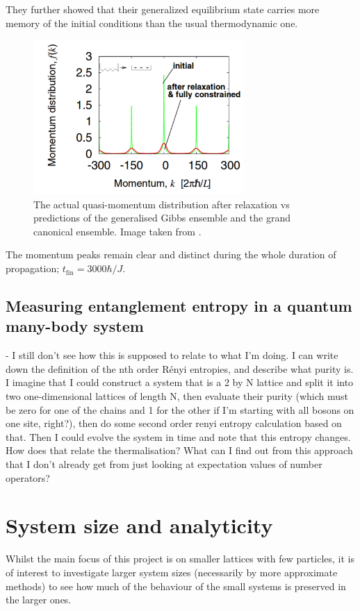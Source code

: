 \documentclass[a4paper,10pt]{article}
\begin{document}
They further showed that their generalized equilibrium state carries more memory of the initial conditions than the usual thermodynamic one.

\begin{figure}[H]
 \begin{center}
 \includegraphics[width=8cm]{after_relaxation_rigol}
 \end{center}
 \caption{The actual quasi-momentum distribution after relaxation vs predictions of the generalised Gibbs ensemble and the grand canonical ensemble. Image taken from \cite{Rigol2007}.}
 \end{figure}

The momentum peaks remain clear and distinct during the whole duration  of  propagation; $t_{\text{fin}}=3000\hbar/J$.

\subsection{Measuring entanglement entropy in a quantum many-body system}
- I still don't see how this is supposed to relate to what I'm doing.
I can write down the definition of the nth order R\'enyi entropies, and describe what purity is. 
I imagine that I could construct a system that is a 2 by N lattice and split it into two one-dimensional lattices of length N, then evaluate their purity (which must be zero for one of the 
chains and 1 for the other if I'm starting with all bosons on one site, right?), then do some second order renyi entropy calculation based on that. Then I could evolve the system in time
and note that this entropy changes. How does that relate the thermalisation? What can I find out from this approach that I don't already get from just looking at expectation values of number 
operators?

\newpage
\section{System size and analyticity}
Whilst the main focus of this project is on smaller lattices with few particles, it is of interest to investigate larger system sizes (necessarily by more approximate methods) to see how much
of the behaviour of the small systems is preserved in the larger ones.
\end{document}
